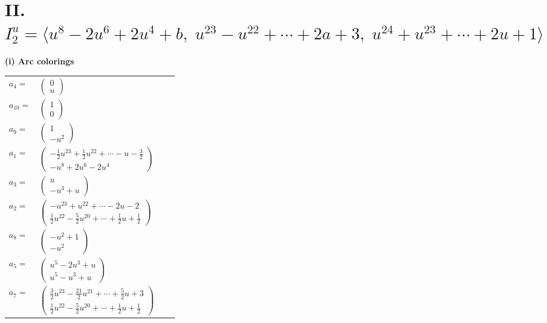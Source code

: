 \documentclass[1p]{elsarticle_modified}
\theoremstyle{definition}
\begin{document}
\centering \section*{II. $I^u_{2}= \langle u^8-2 u^6+2 u^4+b,\;u^{23}- u^{22}+\cdots+2 a+3,\;u^{24}+u^{23}+\cdots+2 u+1 \rangle$}
\flushleft \textbf{(i) Arc colorings}\\
\begin{tabular}{m{7pt} m{180pt} m{7pt} m{180pt} }
\flushright $a_{4}=$&$\begin{pmatrix}0\\u\end{pmatrix}$ \\
\flushright $a_{10}=$&$\begin{pmatrix}1\\0\end{pmatrix}$ \\
\flushright $a_{9}=$&$\begin{pmatrix}1\\- u^2\end{pmatrix}$ \\
\flushright $a_{1}=$&$\begin{pmatrix}-\frac{1}{2} u^{23}+\frac{1}{2} u^{22}+\cdots- u-\frac{3}{2}\\- u^8+2 u^6-2 u^4\end{pmatrix}$ \\
\flushright $a_{3}=$&$\begin{pmatrix}u\\- u^3+u\end{pmatrix}$ \\
\flushright $a_{2}=$&$\begin{pmatrix}- u^{23}+u^{22}+\cdots-2 u-2\\\frac{1}{2} u^{22}-\frac{5}{2} u^{20}+\cdots+\frac{1}{2} u+\frac{1}{2}\end{pmatrix}$ \\
\flushright $a_{8}=$&$\begin{pmatrix}- u^2+1\\- u^2\end{pmatrix}$ \\
\flushright $a_{5}=$&$\begin{pmatrix}u^5-2 u^3+u\\u^5- u^3+u\end{pmatrix}$ \\
\flushright $a_{7}=$&$\begin{pmatrix}\frac{3}{2} u^{23}-\frac{21}{2} u^{21}+\cdots+\frac{5}{2} u+3\\\frac{1}{2} u^{22}-\frac{5}{2} u^{20}+\cdots+\frac{1}{2} u+\frac{1}{2}\end{pmatrix}$ \\

\end{tabular}
\end{document}
